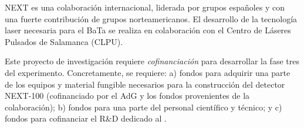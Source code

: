  NEXT es  una colaboración internacional, liderada por grupos españoles y con una fuerte contribución de grupos norteamericanos. El desarrollo de la tecnología laser necesaria para el BaTa se realiza en colaboración con el Centro de Láseres Pulsados de Salamanca (CLPU). 

 Este  proyecto de investigación requiere {\em cofinanciación} para desarrollar la fase tres del experimento. Concretamente, se requiere: a) fondos para adquirir una parte de los equipos y material fungible necesarios para la construcción del detector NEXT-100 (cofinanciado por el AdG y los fondos provenientes de la colaboración); b) fondos para una parte del personal científico y técnico; y c) fondos para cofinanciar el R\&D dedicado al \BATA.  
